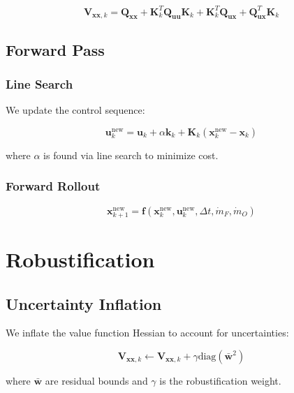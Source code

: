 \documentclass[11pt,a4paper]{article}
\begin{document}
\begin{equation}
\mathbf{V}_{\mathbf{xx},k} = \mathbf{Q}_{\mathbf{xx}} + \mathbf{K}_k^T \mathbf{Q}_{\mathbf{uu}} \mathbf{K}_k + \mathbf{K}_k^T \mathbf{Q}_{\mathbf{ux}} + \mathbf{Q}_{\mathbf{ux}}^T \mathbf{K}_k
\end{equation}

\subsection{Forward Pass}

\subsubsection{Line Search}

We update the control sequence:

\begin{equation}
\mathbf{u}_k^{\text{new}} = \mathbf{u}_k + \alpha \mathbf{k}_k + \mathbf{K}_k (\mathbf{x}_k^{\text{new}} - \mathbf{x}_k)
\end{equation}

where $\alpha$ is found via line search to minimize cost.

\subsubsection{Forward Rollout}

\begin{equation}
\mathbf{x}_{k+1}^{\text{new}} = \mathbf{f}(\mathbf{x}_k^{\text{new}}, \mathbf{u}_k^{\text{new}}, \Delta t, \dot{m}_F, \dot{m}_O)
\end{equation}

\section{Robustification}

\subsection{Uncertainty Inflation}

We inflate the value function Hessian to account for uncertainties:

\begin{equation}
\mathbf{V}_{\mathbf{xx},k} \leftarrow \mathbf{V}_{\mathbf{xx},k} + \gamma \text{diag}(\bar{\mathbf{w}}^2)
\end{equation}

where $\bar{\mathbf{w}}$ are residual bounds and $\gamma$ is the robustification weight.
\end{document}
